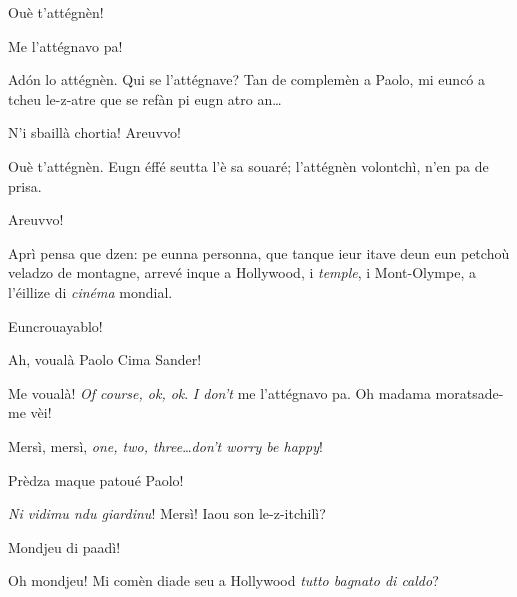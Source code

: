 \begin{drama}
\Conducteurspeaks Ouè t'attégnèn!


\Cimaspeaks Me l'attégnavo pa!


\Conducteurspeaks Ad\'on lo attégnèn. Qui se l'attégnave? Tan de complemèn a Paolo, mi euncó a tcheu le-z-atre que se refàn pi eugn atro an\ldots

\Cimaspeaks{} N'i sbaillà chortia! Areuvvo!

\Conducteurspeaks Ouè t'attégnèn. Eugn éffé seutta l'è sa souaré; l'attégnèn volontchì, n'en pa de prisa.

\Cimaspeaks{} Areuvvo!

\Conducteurspeaks{} Aprì pensa que dzen: pe eunna personna, que tanque ieur itave deun eun petchoù veladzo de montagne, arrevé inque a Hollywood, i \textit{temple}, i Mont-Olympe, a l'éillize di \textit{cinéma} mondial.

\Vallettaspeaks Euncrouayablo!

\Conducteurspeaks Ah, voualà Paolo Cima Sander!


\Cimaspeaks{} Me voualà! \textit{Of course, ok, ok}. \textit{I don't} me l'attégnavo pa.  Oh madama mora\-tsa\-de-me vèi!


\Cimaspeaks Mersì, mersì, \textit{one, two, three}\ldots \textit{don't worry be happy}!

\Conducteurspeaks Prèdza maque patoué Paolo!

\Cimaspeaks{} \textit{Ni vidimu ndu giardinu}! Mersì!  Iaou son le-z-itchilì?


\Cimaspeaks{} Mondjeu di paadì!


\Cimaspeaks Oh mondjeu! Mi comèn diade seu a Hollywood \og \textit{tutto bagnato di caldo}\fg{}?


\end{drama}
